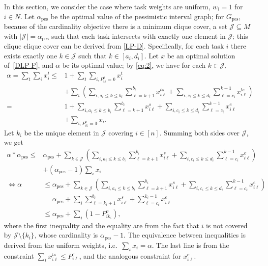 \documentclass[final,5p,times,twocolumn]{elsarticle}
\DeclareMathOperator{\pes}{pes}
\begin{document}
In this section, we consider the case where task weights are uniform, $ w_i = 1 $ for $ i \in N$.
Let $\alpha_{\pes}$ be the optimal value of the pessimistic interval graph; 
for $G_\pes$, because of the cardinality objective there is a minimum clique cover, a set $\mathcal{J}\subseteq M$ with $ \lvert \mathcal{J} \rvert = \alpha_{\pes} $ such that each task intersects with exactly one element in $\mathcal{J}$; this clique clique cover can be derived from \eqref{LP-D}. 
Specifically, for each task $i$ there exists exactly one $k\in \mathcal{J}$ such that $k\in[a_i,d_i]$.
Let $x$ be an optimal solution of~\eqref{DLP-P}, and $\alpha$ be its optimal value;
by \eqref{eq:2}, we have for each $k\in\mathcal{J}$,
\begin{align*}
   \alpha = \sum_{t}\sum_{i} x_i^t \leq &1+\sum_{t}\sum_{i, P_{ik}^o = 0} x_i^t\\
   &+\sum_t \left(\sum_{i,a_i\leq k\leq b_i}\sum_{\ell = k+1}^{b_i}x_{i\ell}^{ts}+\sum_{i,c_i\leq k\leq d_i}\sum_{\ell =c_i}^{k-1}x_{i\ell}^{te}\right)\\
   =& 1+\sum_{i,a_i\leq k\leq b_i}\sum_{\ell = k+1}^{b_i}x_{i\ell}^{s}+\sum_{i,c_i\leq k\leq d_i}\sum_{\ell =c_i}^{k-1}x_{i\ell}^{e}\\
   &+\sum_{i, P_{ik}^o = 0} x_i.
\end{align*}
Let $k_i$ be the unique element in $\mathcal{J}$ covering $i\in[n]$.
Summing both sides over $\mathcal{J}$, we get
\begin{align*}
    \alpha*\alpha_{\pes}\leq  &\alpha_{\pes}+\sum_{k\in\mathcal{J}}\left(\sum_{i,a_i\leq k\leq b_i}\sum_{\ell = k+1}^{b_i}x_{i\ell}^{s}+\sum_{i,c_i\leq k\leq d_i}\sum_{\ell =c_i}^{k-1}x_{i\ell}^{e}\right)\\
    &+(\alpha_{\pes}-1)\sum_{i}x_i\\
    \iff
    \alpha &\leq \alpha_{\pes}+\sum_{k\in\mathcal{J}}\left(\sum_{i,a_i\leq k\leq b_i}\sum_{\ell = k+1}^{b_i}x_{i\ell}^{s }+\sum_{i,c_i\leq k\leq d_i}\sum_{\ell =c_i}^{k-1}x_{i\ell}^{e}\right)\\
    &=\alpha_{\pes}+\sum_{i}\sum_{\ell=k_i+1}^{b_i}x_{i\ell}^{s}+\sum_{\ell=c_i}^{k_i-1}x_{i\ell}^{e}\\
    &\leq \alpha_{\pes}+\sum_i (1-P_{ik_i}^o) ,
\end{align*}
where the first inequality and the equality are from the fact that $i$ is not covered by $\mathcal{J}\setminus\{k_i\}$, whose cardinality is $\alpha_\pes-1$. 
The equivalence between inequalities is derived  from the uniform weights, i.e.\ $\sum_{i}x_i = \alpha$.
The last line is from the constraint $\sum_{t}x_{i\ell}^{ts}\leq P_{i\ell}^s$, and the analogous constraint for $x_{i\ell}^e$.
\end{document}
